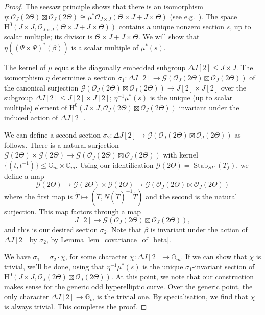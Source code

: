 \documentclass{article} %
\numberwithin{equation}{section}
\newcommand{\G}{\mathbb{G}}
\DeclareMathOperator{\Stab}{Stab}
\renewcommand{\O}{\mathcal{O}}
\newcommand{\HH}{\mathrm{H}}
\newcommand{\cO}{\mathcal{O}}
\begin{document}
\begin{proof}
    The seesaw principle shows that there is an isomorphism $\eta :   \O_J(2 \Theta) \boxtimes \O_J(2 \Theta) \cong \mu^\ast \cO_{J \times J}(\Theta \times J + J \times \Theta)$ (see e.g.\ \cite[\S 3, Proposition 1]{Mum66}). The space $\HH^0(J \times J, \cO_{J \times J}(\Theta \times J + J \times \Theta))$ contains a unique nonzero section $s$, up to scalar multiple; its divisor is $\Theta \times J + J \times \Theta$. We will show that $\eta((\Psi \times \Psi)^\ast(\beta))$ is a scalar multiple of $\mu^\ast(s)$. 

    The kernel of $\mu$ equals the diagonally embedded subgroup $\Delta J[2] \leq J \times J$. The isomorphism $\eta$ determines a section $\sigma_1 : \Delta J[2] \to \mathcal{G}(\O_J(2 \Theta) \boxtimes \O_J(2 \Theta))$ of the canonical surjection
    $\mathcal{G}(\O_J(2 \Theta) \boxtimes \O_J(2 \Theta)) \to J[2] \times J[2]$ over the subgroup $\Delta J[2] \leq J[2] \times J[2]$; $\eta^{-1} \mu^\ast(s)$ is the unique (up to scalar multiple) element of $\HH^0(J \times J, \O_J(2 \Theta) \boxtimes \O_J(2 \Theta))$ invariant under the induced action of $\Delta J[2]$.

    We can define a second section $\sigma_2 : \Delta J[2] \to \mathcal{G}(\O_J(2 \Theta) \boxtimes \O_J(2 \Theta))$ as follows. There is a natural surjection $\mathcal{G}(2 \Theta) \times \mathcal{G}(2 \Theta) \to \mathcal{G}(\O_J(2 \Theta) \boxtimes \O_J(2 \Theta))$ with kernel $\{ (t, t^{-1}) \} \leq \G_m \times \G_m$. Using our identification $\mathcal{G}(2 \Theta) = \Stab_{S \Gamma}(T_f)$, we define a map
    \[ \mathcal{G}(2 \Theta) \to \mathcal{G}(2 \Theta) \times \mathcal{G}(2 \Theta) \to \mathcal{G}(\O_J(2 \Theta) \boxtimes \O_J(2 \Theta)) \]
    where the first map is $\widetilde{T} \mapsto (\widetilde{T}, N(\widetilde{T})^{-1} \widetilde{T})$ and the second is the natural surjection. This map factors through a map
    \[ J[2] \to \mathcal{G}(\O_J(2 \Theta) \boxtimes \O_J(2 \Theta)), \]
    and this is our desired section $\sigma_2$. Note that  $\beta$ is invariant under the action of $\Delta J[2]$ by $\sigma_2$, by Lemma \ref{lem_covariance_of_beta}.  
   
    We have $\sigma_1 = \sigma_2 \cdot \chi$, for some character $\chi : \Delta J[2] \to \G_m$. If we can show that $\chi$ is trivial, we'll be done, using that $\eta^{-1} \mu^\ast(s)$ is the unique $\sigma_1$-invariant section of $\HH^0(J \times J, \O_J(2 \Theta) \boxtimes \O_J(2 \Theta))$. At this point, we note that our construction makes sense for the generic odd hyperelliptic curve. Over the generic point, the only character $\Delta J[2] \to \G_m$ is the trivial one. By specialisation, we find that $\chi$ is always trivial. This completes the proof. 
\end{proof}
\end{document}
